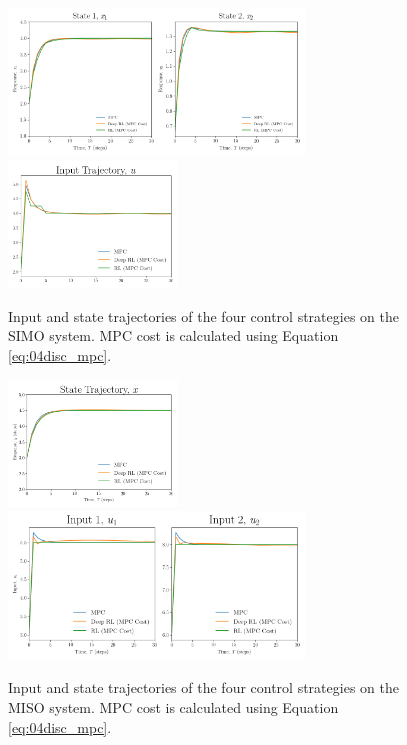 \begin{figure}[H]
    \centering
    \includegraphics[width=0.7\textwidth]{images/ch4/State_SIMO.png}
    \includegraphics[width=0.4\textwidth]{images/ch4/Input_SIMO.png}
    \caption{Input and state trajectories of the four control strategies on the SIMO system.  MPC cost is calculated using Equation \ref{eq:04disc_mpc}.}
    \label{fig:04SIMO_disc}
\end{figure}

\begin{figure}[H]
    \centering
    \includegraphics[width=0.4\textwidth]{images/ch4/State_MISO.png}
    \includegraphics[width=0.7\textwidth]{images/ch4/Input_MISO.png}
    \caption{Input and state trajectories of the four control strategies on the MISO system.  MPC cost is calculated using Equation \ref{eq:04disc_mpc}.}
    \label{fig:04MISO_disc}
\end{figure}

